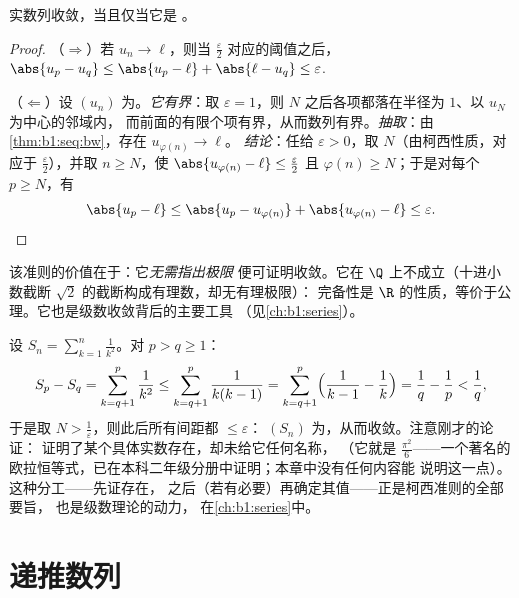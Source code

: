 \begin{theorem}[$\R$ 的完备性]\label{thm:b1:seq:complete}
实数列收敛，当且仅当它是
。
\end{theorem}

\begin{proof}
（$\Rightarrow$）若 $u_n \to \ell$，则当
$\frac\varepsilon2$ 对应的阈值之后，$\abs{u_p - u_q} \leq \abs{u_p - \ell} +
\abs{\ell - u_q} \leq \varepsilon$.

（$\Leftarrow$）设 $(u_n)$ 为。\emph{它有界}：取
$\varepsilon = 1$，则 $N$ 之后各项都落在半径为 $1$、以 $u_N$ 为中心的邻域内，
而前面的有限个项有界，从而数列有界。\emph{抽取}：由
\cref{thm:b1:seq:bw}，存在 $u_{\varphi(n)} \to \ell$。
\emph{结论}：任给 $\varepsilon > 0$，取 $N$（由柯西性质，对应于
$\frac\varepsilon2$），并取 $n \geq N$，使 $\abs{u_{\varphi(n)} - \ell}
\leq \frac\varepsilon2$ 且 $\varphi(n) \geq N$；于是对每个 $p
\geq N$，有
\[
\abs{u_p - \ell} \leq \abs{u_p - u_{\varphi(n)}} +
\abs{u_{\varphi(n)} - \ell} \leq \varepsilon . \qedhere
\]
\end{proof}

\begin{remark}
该准则的价值在于：它\emph{无需指出极限
}便可证明收敛。它在 $\Q$ 上不成立（十进小数截断
$\sqrt 2$ 的截断构成有理数，却无有理极限）：
完备性是 $\R$ 的性质，等价于公理。它也是级数收敛背后的主要工具
（见\cref{ch:b1:series}）。
\end{remark}

\begin{example}[极限不可见的柯西序列]\label{ex:b1:seq:basel}
设 $S_n = \sum_{k=1}^{n} \frac{1}{k^2}$。对 $p > q \geq 1$：
\[
S_p - S_q = \sum_{k=q+1}^{p} \frac{1}{k^2}
\leq \sum_{k=q+1}^{p} \frac{1}{k(k-1)}
= \sum_{k=q+1}^{p} \Bigl(\frac{1}{k-1} - \frac 1k\Bigr)
= \frac 1q - \frac 1p < \frac 1q ,
\]
于是取 $N > \frac1\varepsilon$，则此后所有间距都 $\leq \varepsilon$：
$(S_n)$ 为，从而收敛。注意刚才的论证：
证明了某个具体实数存在，却未给它任何名称，
（它就是 $\frac{\pi^2}{6}$——一个著名的
欧拉恒等式，已在本科二年级分册中证明；本章中没有任何内容能
说明这一点）。这种分工——先证存在，
之后（若有必要）再确定其值——正是柯西准则的全部要旨，
也是级数理论的动力，
在\cref{ch:b1:series}中。
\end{example}

\section{递推数列}


